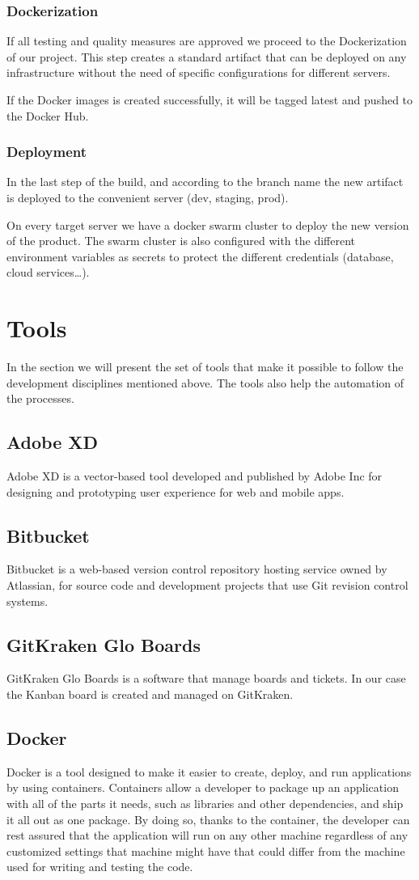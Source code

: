 \begin{spacing}{1.2}
\subsubsection{Dockerization}
If all testing and quality measures are approved we proceed to the Dockerization of our project.
This step creates a standard artifact that can be deployed on any infrastructure without the need of specific configurations for different servers.

If the Docker images is created successfully, it will be tagged latest and pushed to the Docker Hub.

\subsubsection{Deployment}
In the last step of the build, and according to the branch name the new artifact is deployed to the convenient server (dev, staging, prod).

On every target server we have a docker swarm cluster to deploy the new version of the product.
The swarm cluster is also configured with the different environment variables as secrets to protect the different credentials (database, cloud services\dots).
\section{Tools}
In the section we will present the set of tools that make it possible to follow the development disciplines mentioned above. The tools also help the automation of the processes.
\subsection{Adobe XD}
Adobe XD is a vector-based tool developed and published by Adobe Inc for designing and prototyping user experience for web and mobile apps.
\subsection{Bitbucket}
Bitbucket is a web-based version control repository hosting service owned by Atlassian, for source code and development projects that use Git revision control systems.
\subsection{GitKraken Glo Boards}
GitKraken Glo Boards is a software that manage boards and tickets. In our case the Kanban board is created and managed on GitKraken.
\subsection{Docker}
Docker is a tool designed to make it easier to create, deploy, and run applications by using containers. Containers allow a developer to package up an application with all of the parts it needs, such as libraries and other dependencies, and ship it all out as one package. By doing so, thanks to the container, the developer can rest assured that the application will run on any other machine regardless of any customized settings that machine might have that could differ from the machine used for writing and testing the code.

\end{spacing}
